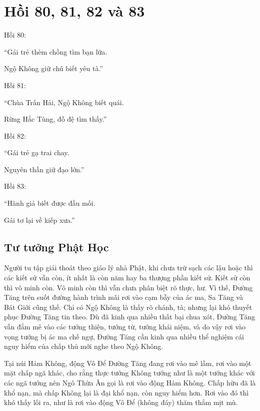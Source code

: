 \chapter{Hồi 80, 81, 82 và 83} %
\label{cha:hoi_80_81}

Hồi 80:

\begin{itshape}
``Gái trẻ thèm chồng tìm bạn lứa.

Ngộ Không giữ chú biết yêu tà.''
\end{itshape}

Hồi 81:

\begin{itshape}
``Chùa Trấn Hải, Ngộ Không biết quái.

Rừng Hắc Tùng, đồ đệ tìm thầy.''
\end{itshape}

Hồi 82:

\begin{itshape}
``Gái trẻ gạ trai chay.

Nguyên thần giữ đạo lớn.''
\end{itshape}

Hồi 83:

\begin{itshape}
``Hành giả biết được đầu mối.

Gái tơ lại về kiếp xưa.''
\end{itshape}

\section{Tư tưởng Phật Học} %
\label{sec:80_81_phat_hoc}

Người tu tập giải thoát theo giáo lý nhà Phật, khi chưa trừ sạch các lậu hoặc thì các kiết sử vẫn còn, ít nhất là còn năm hay ba thượng phần kiết sử. Kiết sử còn thì vô minh còn. Vô minh còn thì vẫn chưa phân biệt rõ thực, hư. Vì thế, Đường Tăng trên suốt đường hành trình mãi rơi vào cạm bẫy của ác ma, Sa Tăng và Bát Giới cũng thế. Chỉ có Ngộ Không là thấy rõ chánh, tà; nhưng lại khó thuyết phục Đường Tăng tin theo. Dù đã kinh qua nhiều thất bại chua xót, Đường Tăng vẫn đắm mê vào các tướng thiện, tướng từ, tướng khái niệm, và do vậy rơi vào vọng tưởng bị ác ma chế ngự, Đường Tăng cần kinh qua nhiều thể nghiệm cái nguy hiểm của chấp thủ mới nghe theo Ngộ Không.

Tại núi Hảm Không, động Vô Để Đường Tăng đang rơi vào mê lầm, rơi vào một mặt chấp ngã khác, cho rằng thực tướng Không tướng như là một tướng khác với các ngã tướng nên Ngô Thừa Ân gọi là rơi vào động Hảm Không. Chấp hữu đã là khổ nạn, mà chấp Không lại là đại khổ nạn, còn nguy hiểm hơn. Rơi vào đó thì khó thấy lối ra, như là rơi vào động Vô Để (không đáy) thăm thẳm mịt mù.

